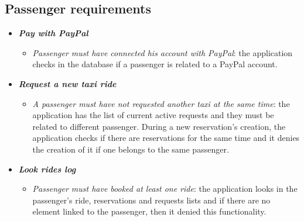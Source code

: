 \subsection{Passenger requirements}
\begin{itemize}

\item \textbf{\textit{Pay with PayPal}}
\begin{itemize}
\item \textit{Passenger must have connected his account with PayPal}: the application checks in the database if a passenger is related to a PayPal account.
\end{itemize}

\item \textbf{\textit{Request a new taxi ride}}
\begin{itemize}
\item \textit{A passenger must have not requested another taxi at the same time}: the application has the list of current active requests and they must be related to different passenger. During a new reservation's creation, the application checks if there are reservations for the same time and it denies the creation of it if one belongs to the same passenger.
\end{itemize}

\item \textbf{\textit{Look rides log}}
\begin{itemize}
\item \textit{Passenger must have booked at least one ride}: the application looks in the passenger's ride, reservations and requests lists and if there are no element linked to the passenger, then it denied this functionality.
\end{itemize}
\end{itemize}

